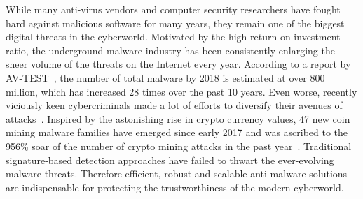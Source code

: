 
\label{DL:SubSec:MC}
While many anti-virus vendors and computer security researchers have fought hard against malicious software for many years,
they remain one of the biggest digital threats in the cyberworld.
Motivated by the high return on investment ratio,
the underground malware industry has been consistently enlarging the sheer volume of the threats on the Internet every year.
According to a report by AV-TEST~\cite{AvTest}, the number of total malware by 2018 is estimated at over 800 million,
which has increased 28 times over the past 10 years.
Even worse, recently viciously keen cybercriminals made a lot of efforts to diversify their avenues of attacks~\cite{SymantecReport}.
Inspired by the astonishing rise in crypto currency values,
47 new coin mining malware families have emerged since early 2017 and was ascribed to the 956\% soar of the number of crypto mining attacks in the past year~\cite{CryptoMiningAttacks}.
Traditional signature-based detection approaches have failed to thwart the ever-evolving malware threats.
Therefore efficient, robust and scalable anti-malware solutions are indispensable for protecting the trustworthiness of the modern cyberworld.


